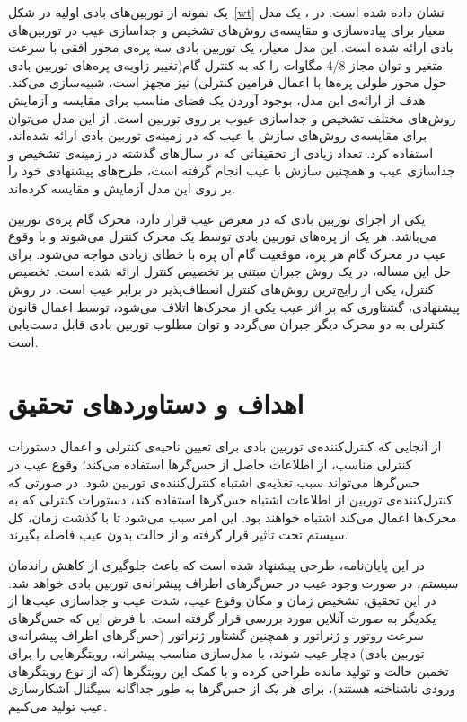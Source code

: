 یک نمونه از توربین‌های بادی اولیه در شکل~\ref{wt} نشان داده شده است. در \cite{a1}، یک مدل معیار برای پیاده‌سازی و مقایسه‌ی روش‌های تشخیص و جداسازی عیب در توربین‌های بادی ارائه شده است. این مدل معیار، یک توربین بادی سه پره‌ی  محور افقی با سرعت متغیر و توان مجاز 4/8 مگا‌وات را که به کنترل گام(تغییر زاویه‌ی پره‌‌های توربین بادی حول محور طولی پره‌ها با اعمال فرامین کنترلی) نیز مجهز است، شبیه‌سازی می‌کند. هدف از ارائه‌ی این مدل، بوجود آوردن یک فضای مناسب برای مقایسه و آزمایش روش‌های مختلف تشخیص و جداسازی عیوب بر روی توربین است. از این مدل می‌توان برای مقایسه‌ی روش‌های سازش با عیب که در زمینه‌ی توربین بادی ارائه شده‌اند، استفاده کرد. تعداد زیادی از تحقیقاتی که در سال‌های گذشته در زمینه‌ی تشخیص و جداسازی عیب و همچنین سازش با عیب انجام گرفته است، طرح‌های پیشنهادی خود را بر روی این مدل آزمایش و مقایسه کرده‌اند. 

یکی از اجزای توربین بادی که در معرض عیب قرار دارد، محرک گام پره‌ی توربین می‌باشد. هر یک از پره‌های توربین بادی توسط یک محرک کنترل می‌شوند و با وقوع عیب در  محرک‌ گام هر پره، موقعیت گام آن پره با خطای زیادی مواجه می‌شود. برای حل این مساله،  در \cite{a10} یک روش جبران مبتنی بر تخصیص کنترل ارائه شده است. تخصیص کنترل، یکی از رایج‌ترین روش‌های کنترل انعطاف‌پذیر در برابر عیب است. در روش پیشنهادی، گشتاوری که بر اثر عیب یکی از محرک‌ها اتلاف می‌شود، توسط اعمال قانون کنترلی به دو محرک دیگر جبران می‌گردد و توان مطلوب توربین بادی قابل دست‌یابی است.



\section{اهداف و دستاوردهای تحقیق}
از آنجایی که کنترل‌کننده‌ی توربین بادی برای تعیین ناحیه‌ی کنترلی و اعمال دستورات کنترلی مناسب، از اطلاعات حاصل از حس‌گر‌ها استفاده می‌کند؛ وقوع عیب در حس‌گر‌ها می‌تواند سبب تغذیه‌ی اشتباه کنترل‌کننده‌ی توربین شود. در صورتی که کنترل‌کننده‌ی توربین از اطلاعات اشتباه حس‌گر‌ها استفاده کند، دستورات کنترلی که به محرک‌ها اعمال می‌کند اشتباه خواهند بود. این امر سبب می‌شود تا با گذشت زمان، کل سیستم تحت تاثیر قرار گرفته و از حالت بدون عیب فاصله بگیرند. 

در این پایان‌نامه، طرحی پیشنهاد شده است که باعث جلوگیری از کاهش راندمان سیستم، در صورت وجود عیب در حس‌گر‌های اطراف پیشرانه‌ی توربین بادی خواهد شد. در این تحقیق، تشخیص زمان و مکان وقوع عیب، شدت عیب و جداسازی عیب‌ها از یکدیگر به صورت آنلاین مورد بررسی قرار گرفته است. با فرض این که حس‌گر‌های سرعت روتور و ژنراتور و همچنین گشتاور ژنراتور (حس‌گر‌های اطراف پیشرانه‌ی توربین بادی) دچار عیب شوند، با مدل‌سازی مناسب پیشرانه، رویتگر‌هایی را برای تخمین حالت و تولید مانده طراحی کرده و با کمک این رویتگر‌ها (که از نوع رویتگر‌های ورودی ناشناخته هستند)، برای هر یک از حس‌گر‌ها به طور جداگانه سیگنال آشکارسازی عیب تولید می‌کنیم. 


